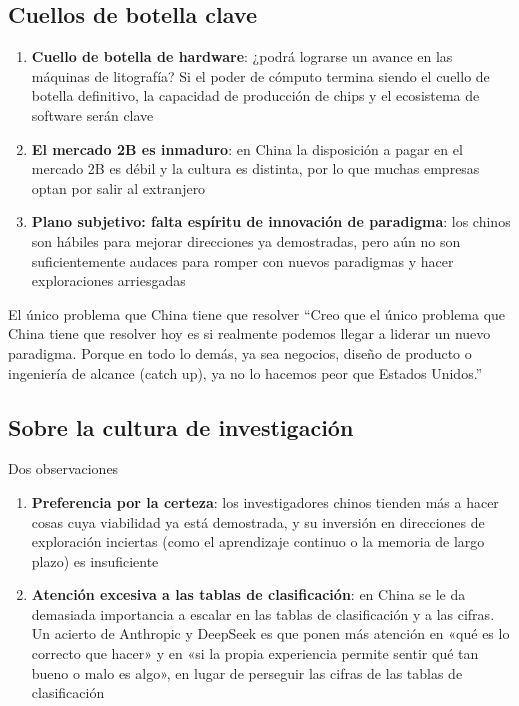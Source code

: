 \documentclass[a4paper]{article}
\begin{document}
\subsection{Cuellos de botella clave}

\begin{enumerate}
\item \textbf{Cuello de botella de hardware}: ¿podrá lograrse un avance en las máquinas de litografía? Si el poder de cómputo termina siendo el cuello de botella definitivo, la capacidad de producción de chips y el ecosistema de software serán clave
\item \textbf{El mercado 2B es inmaduro}: en China la disposición a pagar en el mercado 2B es débil y la cultura es distinta, por lo que muchas empresas optan por salir al extranjero
\item \textbf{Plano subjetivo: falta espíritu de innovación de paradigma}: los chinos son hábiles para mejorar direcciones ya demostradas, pero aún no son suficientemente audaces para romper con nuevos paradigmas y hacer exploraciones arriesgadas
\end{enumerate}

\begin{warningbox}{El único problema que China tiene que resolver}
``Creo que el único problema que China tiene que resolver hoy es si realmente podemos llegar a liderar un nuevo paradigma. Porque en todo lo demás, ya sea negocios, diseño de producto o ingeniería de alcance (catch up), ya no lo hacemos peor que Estados Unidos.''
\end{warningbox}

\subsection{Sobre la cultura de investigación}

\begin{knowledgebox}{Dos observaciones}
\begin{enumerate}
\item \textbf{Preferencia por la certeza}: los investigadores chinos tienden más a hacer cosas cuya viabilidad ya está demostrada, y su inversión en direcciones de exploración inciertas (como el aprendizaje continuo o la memoria de largo plazo) es insuficiente
\item \textbf{Atención excesiva a las tablas de clasificación}: en China se le da demasiada importancia a escalar en las tablas de clasificación y a las cifras. Un acierto de Anthropic y DeepSeek es que ponen más atención en «qué es lo correcto que hacer» y en «si la propia experiencia permite sentir qué tan bueno o malo es algo», en lugar de perseguir las cifras de las tablas de clasificación
\end{enumerate}
\end{knowledgebox}
\end{document}

